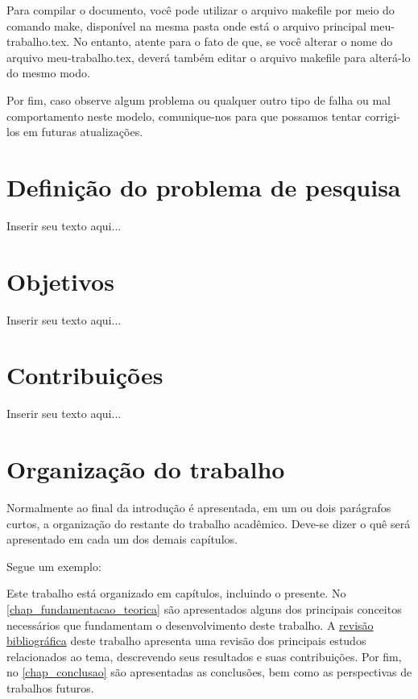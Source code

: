 Para compilar o documento, você pode utilizar o arquivo {\color{red} makefile} por meio do comando {\color{red} make}, disponível na mesma pasta onde está o arquivo principal {\color{red} meu-\allowbreak trabalho.tex}.
No entanto, atente para o fato de que, se você alterar o nome do arquivo {\color{red} meu-\allowbreak trabalho.tex}, deverá também editar o arquivo {\color{red} makefile} para alterá-lo do mesmo modo.

Por fim, caso observe algum problema ou qualquer outro tipo de falha ou mal comportamento neste modelo, comunique-nos para que possamos tentar corrigi-los em futuras atualizações.

\section{Definição do problema de pesquisa}
\label{sec_definicao_problema_pesquisa}

Inserir seu texto aqui...

\section{Objetivos}
\label{sec_objetivos}

Inserir seu texto aqui...

\section{Contribuições}
\label{sec_contribuicoes}

Inserir seu texto aqui...

\section{Organização do trabalho}
\label{sec_organizacao_trabalho}

Normalmente ao final da introdução é apresentada, em um ou dois parágrafos curtos, a organização do restante do trabalho acadêmico.
Deve-se dizer o quê será apresentado em cada um dos demais capítulos.

Segue um exemplo:

Este trabalho está organizado em capítulos, incluindo o presente.
No \autoref{chap_fundamentacao_teorica} são apresentados alguns dos principais conceitos necessários que fundamentam o desenvolvimento deste trabalho.
A \hyperref[chap_trabalhos_relacionados]{revisão bibliográfica} deste trabalho apresenta uma revisão dos principais estudos relacionados ao tema, descrevendo seus resultados e suas contribuições.
Por fim, no \autoref{chap_conclusao} são apresentadas as conclusões, bem como as perspectivas de trabalhos futuros.

